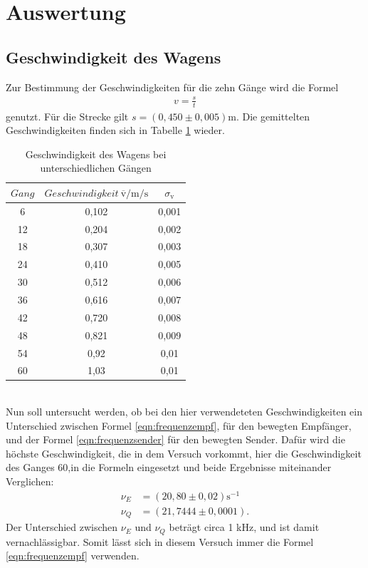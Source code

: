 \section{Auswertung}
\label{sec:Auswertung}
\subsection{Geschwindigkeit des Wagens}
Zur Bestimmung der Geschwindigkeiten für die zehn Gänge wird die Formel
\begin{align}
  v=\frac{s}{t}
\end{align}
genutzt. Für die Strecke gilt $s=(0,450\pm0,005)$m.
Die gemittelten Geschwindigkeiten finden sich in Tabelle \ref{tab:v} wieder.
\begin{table}
  \centering
  \caption{Geschwindigkeit des Wagens bei unterschiedlichen Gängen}
  \label{tab:v}
  \begin{tabular}{c c c}
    \toprule
    $Gang$ & $Geschwindigkeit\ \overline{\text{v}}/\si{\meter\per\second}$ & $\sigma_{\text{v}}$\\
    \midrule
    6  & 0,102 & 0,001\\
    12 & 0,204 & 0,002\\
    18 & 0,307 & 0,003\\
    24 & 0,410 & 0,005\\
    30 & 0,512 & 0,006\\
    36 & 0,616 & 0,007\\
    42 & 0,720 & 0,008\\
    48 & 0,821 & 0,009\\
    54 & 0,92  & 0,01\\
    60 & 1,03  & 0,01\\
    \bottomrule
   \end{tabular}
\end{table}\\
Nun soll untersucht werden, ob bei den hier verwendeteten Geschwindigkeiten
ein Unterschied zwischen Formel \eqref{eqn:frequenzempf}, für den bewegten Empfänger,
und der Formel \eqref{eqn:frequenzsender} für den bewegten Sender.
Dafür wird die höchste Geschwindigkeit, die in dem Versuch vorkommt,
hier die Geschwindigkeit des Ganges 60,in die Formeln eingesetzt
und beide Ergebnisse miteinander Verglichen:
\begin{align}
  \nu_E&=(20,80\pm0,02)\si{\second\tothe{-1}}\\
  \nu_Q&=(21,7444\pm0,0001).
\end{align}
Der Unterschied zwischen $\nu_E$ und $\nu_Q$ beträgt circa 1 kHz, und ist damit
vernachlässigbar. Somit lässt sich in diesem Versuch immer die Formel \eqref{eqn:frequenzempf}
verwenden.

